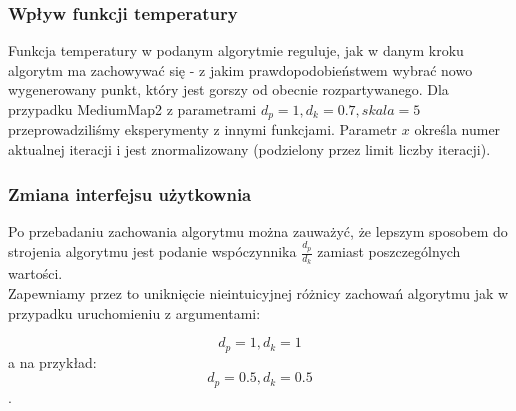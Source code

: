 \documentclass[12pt,a4paper]{article}
\begin{document}
\subsubsection{Wpływ funkcji temperatury}
Funkcja temperatury w podanym algorytmie reguluje, jak w danym kroku algorytm
ma zachowywać się - z jakim prawdopodobieństwem wybrać nowo wygenerowany punkt,
który jest gorszy od obecnie rozpartywanego.
Dla przypadku MediumMap2 z parametrami $d_p=1, d_k=0.7, skala=5$ przeprowadziliśmy
eksperymenty z innymi funkcjami. Parametr $x$ określa numer aktualnej iteracji
i jest znormalizowany (podzielony przez limit liczby iteracji).
\begin{figure}[H]
\begin{floatrow}
       }
       \ffigbox[\FBwidth]{\caption{MediumMap2, \newline
       $f(x)=exp(-x/100)$}\label{fig-14}}{%
         \texttt{[image: \{mediumMap2exp100]}.png}
       }
       \end{floatrow}
\end{figure}
\begin{figure}[H]
\begin{floatrow}
       }
       \ffigbox[\FBwidth]{\caption{MediumMap2, \newline
       $f(x)=-log(x)$}\label{fig-16}}{%
         \texttt{[image: \{mediumMap2log]}.png}
       }
       \end{floatrow}
\end{figure}

\subsubsection{Zmiana interfejsu użytkownia}
Po przebadaniu zachowania algorytmu można zauważyć,
że lepszym sposobem do strojenia algorytmu jest podanie
wspóczynnika $\frac{d_p}{d_k}$ zamiast poszczególnych wartości. \\ 
Zapewniamy przez to uniknięcie nieintuicyjnej różnicy zachowań algorytmu
jak w przypadku uruchomieniu z argumentami:
\begin{center}
\[d_p = 1, d_k = 1\]
a na przykład: \linebreak
\[d_p = 0.5, d_k = 0.5\].
\end{center}
%
\newpage
\end{document}
